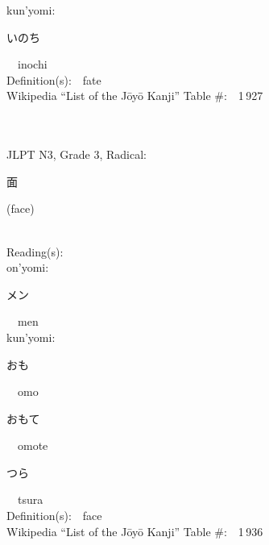 \begin{multicols}{2}
{\hspace*{1em}}kun'yomi:\ \ \\
{\hspace*{2em}}{\begin{CJK}{UTF8}{min} いのち \end{CJK}}\ \ inochi\ \ \\
Definition(s):\ \ fate \\
Wikipedia ``List of the J\=oy\=o Kanji'' Table \#:\ \ 1\,927 \\
\ \ \\
{\fontsize{34pt}{40pt}  }\ \ \\  %
{JLPT N3, Grade 3, Radical:\ \ {\begin{CJK}{UTF8}{min} 面 \end{CJK}} (face) } \\
Reading(s):\ \ \\
{\hspace*{1em}}on'yomi:\ \ \\
{\hspace*{2em}}{\begin{CJK}{UTF8}{min} メン \end{CJK}}\ \ men\ \ \\
{\hspace*{1em}}kun'yomi:\ \ \\
{\hspace*{2em}}{\begin{CJK}{UTF8}{min} おも \end{CJK}}\ \ omo\ \ \\
{\hspace*{2em}}{\begin{CJK}{UTF8}{min} おもて \end{CJK}}\ \ omote\ \ \\
{\hspace*{2em}}{\begin{CJK}{UTF8}{min} つら \end{CJK}}\ \ tsura\ \ \\
Definition(s):\ \ face \\
Wikipedia ``List of the J\=oy\=o Kanji'' Table \#:\ \ 1\,936 \\
\ \ \\
{\fontsize{34pt}{40pt}  }\ \ \\  %

\end{multicols}

